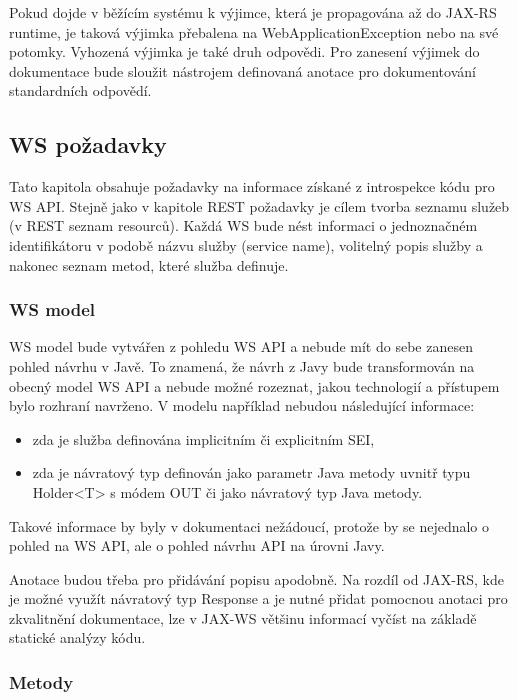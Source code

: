 \documentclass[11pt,twoside,a4paper]{book}
\begin{document}
\begin{itemize}
Pokud dojde v běžícím systému k výjimce, která je propagována až do JAX-RS runtime, je
taková výjimka přebalena na WebApplicationException nebo na své potomky. Vyhozená
výjimka je také druh odpovědi. Pro zanesení výjimek do dokumentace bude sloužit nástrojem
definovaná anotace pro dokumentování standardních odpovědí.

\subsection{WS požadavky}

Tato kapitola obsahuje požadavky na informace získané z introspekce kódu pro WS API.
Stejně jako v kapitole REST požadavky je cílem tvorba seznamu služeb (v REST seznam
resourců). Každá WS bude nést informaci o jednoznačném identifikátoru v podobě názvu
služby (service name), volitelný popis služby a nakonec seznam metod, které služba definuje.

\subsubsection{WS model}

WS model bude vytvářen z pohledu WS API a nebude mít do sebe zanesen pohled návrhu v
Javě. To znamená, že návrh z Javy bude transformován na obecný model WS API a nebude
možné rozeznat, jakou technologií a přístupem bylo rozhraní navrženo. V modelu například
nebudou následující informace:

\begin{itemize}
  \item zda je služba definována implicitním či explicitním SEI,
  \item zda je návratový typ definován jako parametr Java metody uvnitř typu Holder<T> s
módem OUT či jako návratový typ Java metody.
\end{itemize}

Takové informace by byly v dokumentaci nežádoucí, protože by se nejednalo o pohled na WS
API, ale o pohled návrhu API na úrovni Javy.

Anotace budou třeba pro přidávání popisu apodobně. Na rozdíl od JAX-RS, kde je možné
využít návratový typ Response a je nutné přidat pomocnou anotaci pro zkvalitnění
dokumentace, lze v JAX-WS většinu informací vyčíst na základě statické analýzy kódu.

\subsubsection{Metody}


\end{itemize}
\end{document}
